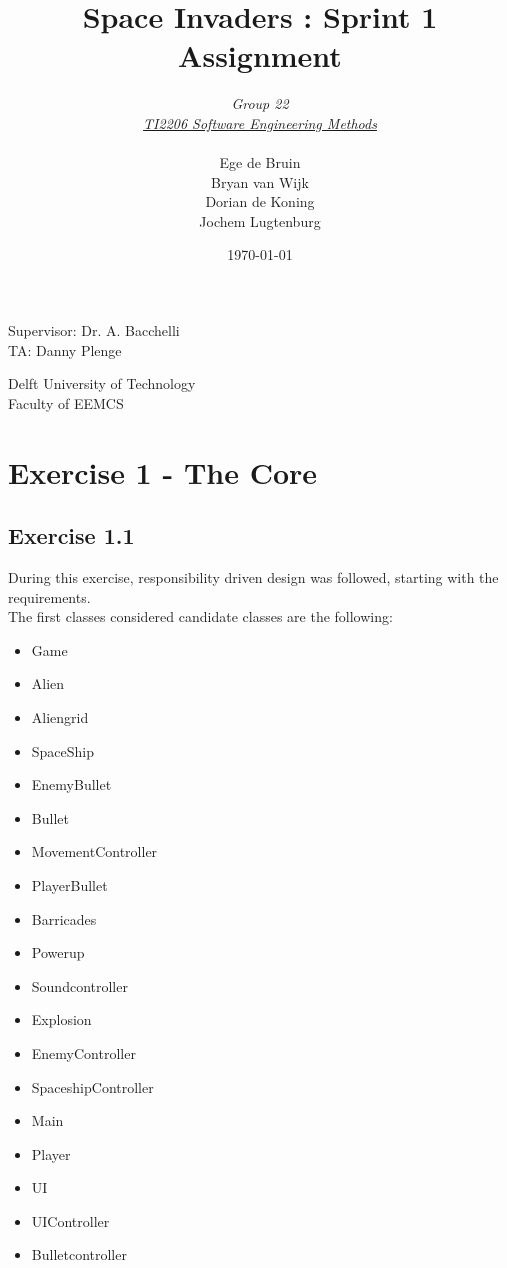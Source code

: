 \documentclass[10pt]{article}
\begin{document}
\title{Space Invaders : Sprint 1 Assignment}
\date{\today}
\author{\textit{Group 22}\\ \textit{\underline{TI2206 Software Engineering Methods}} \\
 \\Ege de Bruin \\ Bryan van Wijk \\ Dorian de Koning \\ Jochem Lugtenburg }
 \maketitle  
 \begin{center}
Supervisor: Dr. A. Bacchelli\\
TA: Danny Plenge\\
 \end{center}     
 \begin{center}
 Delft University of Technology\\
 Faculty of EEMCS\\
 \end{center}
 \thispagestyle{empty}
 \pagebreak
 
\section{Exercise 1 - The Core}

 \subsection*{Exercise 1.1}

During this exercise, responsibility driven design was followed, starting with the requirements.\\
The first classes considered candidate classes are the following:
\begin{itemize}
  \item Game
  \item Alien
  \item Aliengrid
  \item SpaceShip
  \item EnemyBullet
\item Bullet
\item MovementController
\item PlayerBullet
\item Barricades
\item Powerup
\item Soundcontroller
\item Explosion
\item EnemyController
\item SpaceshipController
\item Main
\item Player
\item UI
\item UIController
\item Bulletcontroller

\end{itemize}
\end{document}

